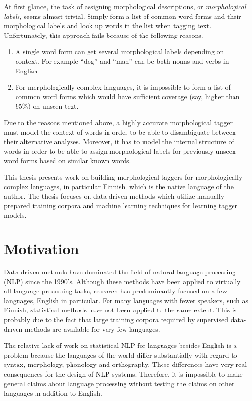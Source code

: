 At first glance, the task of assigning morphological descriptions, or
{\it morphological labels}, seems almost trivial. Simply form a list of
common word forms and their morphological labels and look up words in
the list when tagging text. Unfortunately, this approach
fails because of the following reasons.

\begin{enumerate}
\item A single word form can get several morphological labels
  depending on context. For example ``dog'' and ``man'' can be both
  nouns and verbs in English.
\item For morphologically complex languages, it is impossible to form a
  list of common word forms which would have sufficient coverage (say,
  higher than 95\%) on unseen text.
\end{enumerate}

Due to the reasons mentioned above, a highly accurate morphological
tagger must model the context of words in order to be able to
disambiguate between their alternative analyses. Moreover, it has to
model the internal structure of words in order to be able to assign
morphological labels for previously unseen word forms based on similar
known words.

This thesis presents work on building morphological taggers for
morphologically complex languages, in particular Finnish, which is the
native language of the author. The thesis focuses on data-driven
methods which utilize manually prepared training corpora and machine
learning techniques for learning tagger models.

\section{Motivation}
Data-driven methods have dominated the field of natural language
processing (NLP) since the 1990's. Although these methods have been
applied to virtually all language processing tasks, research has
predominantly focused on a few languages, English in particular. For
many languages with fewer speakers, such as Finnish, statistical
methods have not been applied to the same extent. This is probably due
to the fact that large training corpora required by supervised
data-driven methods are available for very few languages.

The relative lack of work on statistical NLP for languages besides English is a
problem because the languages of the world differ substantially with
regard to syntax, morphology, phonology and orthography. These
differences have very real consequences for the design of NLP
systems. Therefore, it is impossible to make general claims about
language processing without testing the claims on other languages
in addition to English.

